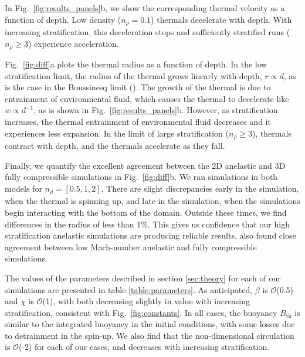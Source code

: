 \documentclass[twocolumn, amsmath, amsfonts, amssymb, trackchanges]{aastex62}
\newcommand{\LJ}{\citetalias{lecoanet&jeevanjee2018}}
\begin{document}
In Fig.~\ref{fig:results_panels}b, we show the corresponding thermal velocity as a function of depth.
Low density ($n_\rho = 0.1$) thermals decelerate with depth.
With increasing stratification, this deceleration stops and sufficiently stratified runs ($n_\rho \geq 3$) experience acceleration.

Fig.~\ref{fig:diff}a plots the thermal radius as a function of depth.
In the low stratification limit, the radius of the thermal grows linearly with depth, $r \propto d$, as is the case in the Boussinesq limit (\LJ).
The growth of the thermal is due to entrainment of environmental fluid, which causes the thermal to decelerate like $w \propto d^{-1}$, as is shown in Fig.~\ref{fig:results_panels}b.
However, as stratification increases, the thermal entrainment of environmental fluid decreases and it experiences less expansion.
In the limit of large stratification ($n_\rho \geq 3$), thermals contract with depth, and the thermals accelerate as they fall.

Finally, we quantify the excellent agreement between the 2D anelastic and 3D fully compressible simulations in Fig.~\ref{fig:diff}b.
We ran simulations in both models for $n_\rho = [0.5, 1, 2]$.
There are slight discrepancies early in the simulation, when the thermal is spinning up, and late in the simulation, when the simulations begin interacting with the bottom of the domain.
Outside these times, we find differences in the radius of less than 1\%.
This gives us confidence that our high stratification anelastic simulations are producing reliable results.
\citet{lecoanet&all2014} also found close agreement between low Mach-number anelastic and fully compressible simulations.

The values of the parameters described in section \ref{sec:theory} for each of our simulations are presented in table \ref{table:parameters}.
As anticipated, $\beta$ is $\mathcal{O}$(0.5) and $\chi$ is $\mathcal{O}$(1), with both decreasing slightly in value with increasing stratification, consistent with Fig.~\ref{fig:constants}.
In all cases, the buoyancy $B_{\text{th}}$ is similar to the integrated buoyancy in the initial conditions, with some losses due to detrainment in the spin-up.
We also find that the non-dimensional circulation is $\mathcal{O}$(-2) for each of our cases, and decreases with increasing stratification.
\end{document}
